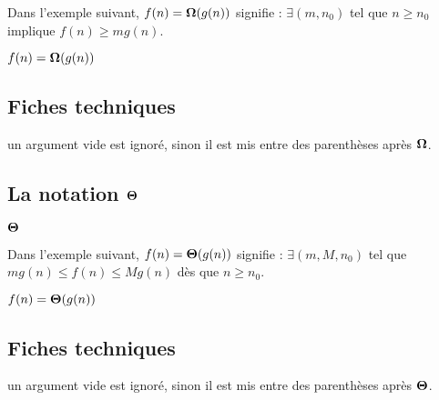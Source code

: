 \documentclass[12pt,a4paper]{article}
\begin{document}
\newparaexample{}

Dans l'exemple suivant, $f(n) = \bigomega{g(n)}$ signifie :
$\exists (m, n_0)$ tel que $n \geq n_0$ implique $f(n) \geq m g(n)$.

\begin{latexex}
$f(n) = \bigomega{g(n)}$
\end{latexex}




\subsection{Fiches techniques}


\IDarg{} un argument vide est ignoré, sinon il est mis entre des parenthèses après $\bigomega{}$.




\subsection{\texorpdfstring{La notation $\bigtheta{}$}%
                           {La notation "grand Theta"}}

\newparaexample{}

\begin{latexex}
$\bigtheta{}$
\end{latexex}




\newparaexample{}

Dans l'exemple suivant, $f(n) = \bigtheta{g(n)}$ signifie : $\exists (m, M, n_0)$ tel que $m g(n) \leq f(n) \leq M g(n)$ dès que $n \geq n_0$.

\begin{latexex}
$f(n) = \bigtheta{g(n)}$
\end{latexex}




\subsection{Fiches techniques}


\IDarg{} un argument vide est ignoré, sinon il est mis entre des parenthèses après $\bigtheta{}$.
\end{document}
